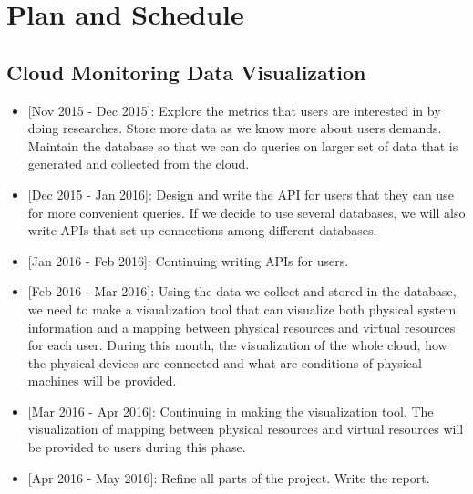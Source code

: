 \section{Plan and Schedule}
\label{sec:Plan}



\subsection{Cloud Monitoring Data Visualization}
\begin{itemize}
\item{[Nov 2015 - Dec 2015]:} Explore the metrics that users are interested in by doing researches. Store more data as we know more about users demands. Maintain the database so that we can do queries on larger set of data that is generated and collected from the cloud. 
\item{[Dec 2015 - Jan 2016]:} Design and write the API for users that they can use for more convenient queries. If we decide to use several databases, we will also write APIs that set up connections among different databases. 
\item{[Jan 2016 - Feb 2016]:} Continuing writing APIs for users.  
\item{[Feb 2016 - Mar 2016]:} Using the data we collect and stored in the database, we need to make a visualization tool that can visualize both physical system information and a mapping between physical resources and virtual resources for each user. During this month, the visualization of the whole cloud, how the physical devices are connected and what are conditions of physical machines will be provided.  
\item{[Mar 2016 - Apr 2016]:} Continuing in making the visualization tool. The visualization of mapping between physical resources and virtual resources will be provided to users during this phase.  
\item{[Apr 2016 - May 2016]:} Refine all parts of the project. Write the report.
\end{itemize}
